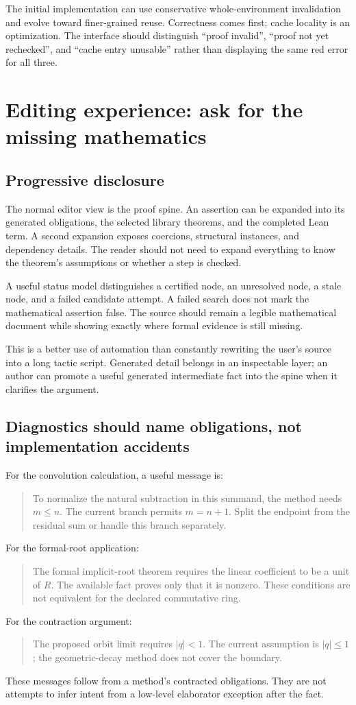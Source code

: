 \documentclass[11pt,letterpaper]{article}
\theoremstyle{definition}
\theoremstyle{remark}
\begin{document}
The initial implementation can use conservative whole-environment invalidation and evolve toward finer-grained reuse. Correctness comes first; cache locality is an optimization. The interface should distinguish ``proof invalid'', ``proof not yet rechecked'', and ``cache entry unusable'' rather than displaying the same red error for all three.

\section{Editing experience: ask for the missing mathematics}
\label{sec:ux}
\subsection{Progressive disclosure}
The normal editor view is the proof spine. An assertion can be expanded into its generated obligations, the selected library theorems, and the completed Lean term. A second expansion exposes coercions, structural instances, and dependency details. The reader should not need to expand everything to know the theorem's assumptions or whether a step is checked.

A useful status model distinguishes a certified node, an unresolved node, a stale node, and a failed candidate attempt. A failed search does not mark the mathematical assertion false. The source should remain a legible mathematical document while showing exactly where formal evidence is still missing.

This is a better use of automation than constantly rewriting the user's source into a long tactic script. Generated detail belongs in an inspectable layer; an author can promote a useful generated intermediate fact into the spine when it clarifies the argument.

\subsection{Diagnostics should name obligations, not implementation accidents}
For the convolution calculation, a useful message is:
\begin{quote}
To normalize the natural subtraction in this summand, the method needs $m\le n$. The current branch permits $m=n+1$. Split the endpoint from the residual sum or handle this branch separately.
\end{quote}
For the formal-root application:
\begin{quote}
The formal implicit-root theorem requires the linear coefficient to be a unit of $R$. The available fact proves only that it is nonzero. These conditions are not equivalent for the declared commutative ring.
\end{quote}
For the contraction argument:
\begin{quote}
The proposed orbit limit requires $|q|<1$. The current assumption is $|q|\le1$; the geometric-decay method does not cover the boundary.
\end{quote}
These messages follow from a method's contracted obligations. They are not attempts to infer intent from a low-level elaborator exception after the fact.
\end{document}
